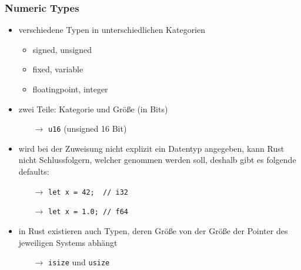 \documentclass[a4paper,12pt]{article}
\begin{document}
\subsubsection*{Numeric Types}
	\begin{itemize}
	  \item verschiedene Typen in unterschiedlichen Kategorien
	  \begin{itemize}
	    \item signed, unsigned
	    \item fixed, variable
	    \item floatingpoint, integer
	  \end{itemize}
	  \item zwei Teile: Kategorie und Größe (in Bits)
	  \begin{itemize}
	      \item[$\rightarrow$] \verb|u16| (unsigned 16 Bit)
	  \end{itemize}
	  \item wird bei der Zuweisung nicht explizit ein Datentyp angegeben, kann Rust nicht Schlussfolgern, welcher genommen werden soll, deshalb gibt es folgende defaults:
	  \begin{itemize}
	      \item[$\rightarrow$] \verb|let x = 42;  // i32| 
	      \item[$\rightarrow$] \verb|let x = 1.0; // f64|
	  \end{itemize}
	  \item in Rust existieren auch Typen, deren Größe von der Größe der Pointer des jeweiligen Systems abhängt
	  \begin{itemize}
	      \item[$\rightarrow$] \verb|isize| und \verb|usize| 
	  \end{itemize}
	\end{itemize}
	
\end{document}
